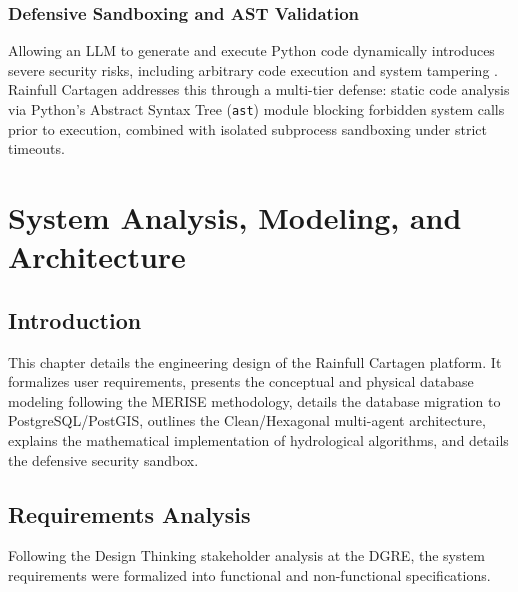 \documentclass[12pt,a4paper]{report}
\begin{document}
\subsection{Defensive Sandboxing and AST Validation}
Allowing an LLM to generate and execute Python code dynamically introduces severe security risks, including arbitrary code execution and system tampering \cite{owasp2024}. Rainfull Cartagen addresses this through a multi-tier defense: static code analysis via Python's Abstract Syntax Tree (\texttt{ast}) module blocking forbidden system calls prior to execution, combined with isolated subprocess sandboxing under strict timeouts.

\newpage

\chapter{System Analysis, Modeling, and Architecture}

\section{Introduction}

This chapter details the engineering design of the Rainfull Cartagen platform. It formalizes user requirements, presents the conceptual and physical database modeling following the MERISE methodology, details the database migration to PostgreSQL/PostGIS, outlines the Clean/Hexagonal multi-agent architecture, explains the mathematical implementation of hydrological algorithms, and details the defensive security sandbox.

\section{Requirements Analysis}

Following the Design Thinking stakeholder analysis at the DGRE, the system requirements were formalized into functional and non-functional specifications.
\end{document}
